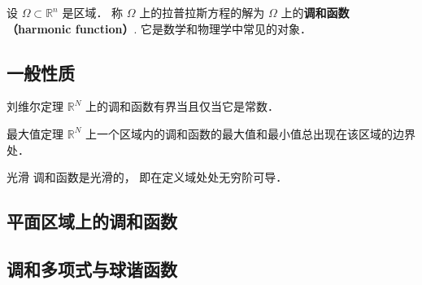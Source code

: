 
\begin{issues}
\issueDraft
\end{issues}


设 $\Omega\subset\mathbb{R}^n$ 是区域． 称 $\Omega$ 上的拉普拉斯方程的解为 $\Omega$ 上的\textbf{调和函数 （harmonic function）}. 它是数学和物理学中常见的对象．


\subsection{一般性质}
\begin{theorem}{刘维尔定理}\label{HarFun_the1}
$\mathbb R^N$ 上的调和函数有界当且仅当它是常数．
\end{theorem}

\begin{theorem}{最大值定理}
$\mathbb R^N$ 上一个区域内的调和函数的最大值和最小值总出现在该区域的边界处．
\end{theorem}

\begin{theorem}{光滑}
调和函数是光滑的， 即在定义域处处无穷阶可导．
\end{theorem}



\subsection{平面区域上的调和函数}


\subsection{调和多项式与球谐函数}
